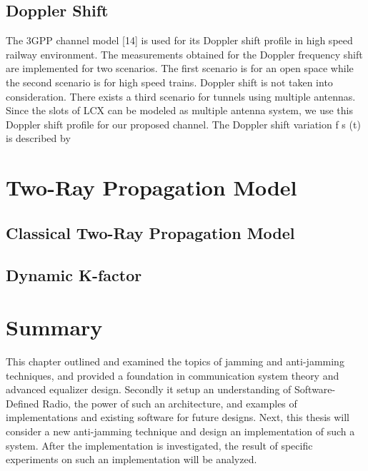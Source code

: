 \subsection{Doppler Shift}
The 3GPP channel model [14] is used for its Doppler shift profile in high speed railway environment. The measurements
obtained for the Doppler frequency shift are implemented for two scenarios. The first scenario is for an open space while
the second scenario is for high speed trains. Doppler shift is not taken into consideration. There exists a third scenario for
tunnels using multiple antennas. Since the slots of LCX can be modeled as multiple antenna system, we use this Doppler shift
profile for our proposed channel. The Doppler shift variation f s (t) is described by

\section{Two-Ray Propagation Model}
	\subsection{Classical Two-Ray Propagation Model}
	\subsection{Dynamic K-factor}
\section{Summary}

This chapter outlined and examined the topics of jamming and anti-jamming techniques, and provided a foundation in communication system theory and advanced equalizer design.  Secondly it setup an understanding of Software-Defined Radio, the power of such an architecture, and examples of implementations and existing software for future designs.  Next, this thesis will consider a new anti-jamming technique and design an implementation of such a system.  After the implementation is investigated, the result of specific experiments on such an implementation will be analyzed.\\

